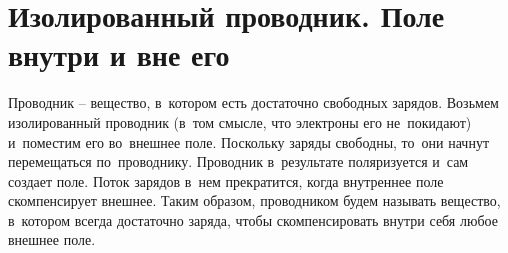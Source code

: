 \section{Изолированный проводник. Поле внутри и вне его}
	
	Проводник -- вещество, в~котором есть достаточно свободных зарядов.
	Возьмем изолированный проводник (в~том смысле, что электроны его не~покидают) и~поместим его во~внешнее поле. Поскольку заряды свободны, то~они начнут перемещаться по~проводнику. Проводник в~результате поляризуется и~сам создает поле. Поток зарядов в~нем прекратится, когда внутреннее поле скомпенсирует внешнее. Таким образом, проводником будем называть вещество, в~котором всегда достаточно заряда, чтобы скомпенсировать внутри себя любое внешнее поле.